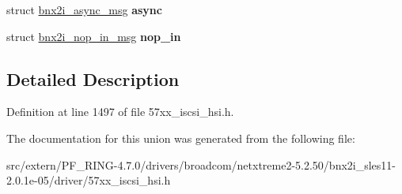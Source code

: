 \begin{DoxyCompactItemize}
\item 
\hypertarget{unioniscsi__response_a75ee12f986b761e93143bdc53f2ac106}{
struct \hyperlink{structbnx2i__async__msg}{bnx2i\_\-async\_\-msg} {\bfseries async}}
\label{unioniscsi__response_a75ee12f986b761e93143bdc53f2ac106}

\item 
\hypertarget{unioniscsi__response_ac43379c833e440958c0ca6024812f4ea}{
struct \hyperlink{structbnx2i__nop__in__msg}{bnx2i\_\-nop\_\-in\_\-msg} {\bfseries nop\_\-in}}
\label{unioniscsi__response_ac43379c833e440958c0ca6024812f4ea}

\end{DoxyCompactItemize}


\subsection{Detailed Description}


Definition at line 1497 of file 57xx\_\-iscsi\_\-hsi.h.



The documentation for this union was generated from the following file:\begin{DoxyCompactItemize}
\item 
src/extern/PF\_\-RING-\/4.7.0/drivers/broadcom/netxtreme2-\/5.2.50/bnx2i\_\-sles11-\/2.0.1e-\/05/driver/57xx\_\-iscsi\_\-hsi.h\end{DoxyCompactItemize}
